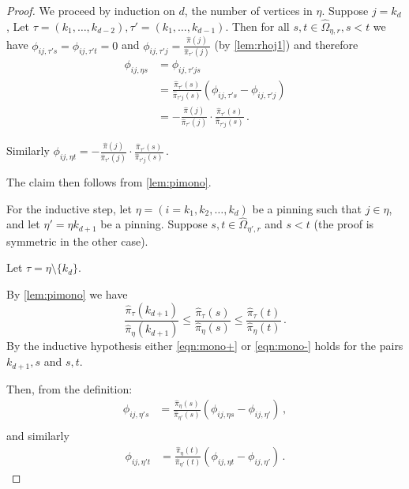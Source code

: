 \documentclass[a4paper, 12p]{article}
\numberwithin{equation}{section}
\newcommand{\Omorproj}{\hat{\Omega}}
\newcommand{\piorproj}{\hat{\pi}}
\begin{document}
\begin{proof}
We proceed by induction on $d$, the number of vertices in $\eta$. Suppose $j = k_d$, Let $\tau = (k_1, \dots, k_{d-2}), \tau' = (k_1, \dots, k_{d-1}).$ Then for all $s, t \in \Omorproj_{\eta, r}, s < t$ we have $\phi_{ij,\tau' s} = \phi_{ij, \tau' t} = 0$ and $\phi_{ij, \tau' j} = \frac{\piorproj(j)}{\piorproj_{\tau'}(j)}$ (by \cref{lem:rhoj1}) and therefore
\begin{align}
  \phi_{ij,\eta s} &= \phi_{ij, \tau' j s} \\
  &= \frac{\piorproj_{\tau'}(s)}{\piorproj_{\tau' j}(s)}(\phi_{ij, \tau' s} - \phi_{ij, \tau' j}) \\
  &= -\frac{\piorproj(j)}{\piorproj_{\tau'}(j)}\cdot \frac{\piorproj_{\tau'}(s)}{\piorproj_{\tau' j}(s)}\,.
\end{align}

Similarly $\phi_{ij,\eta t} = -\frac{\piorproj(j)}{\piorproj_{\tau'}(j)}\cdot \frac{\piorproj_{\tau'}(s)}{\piorproj_{\tau' j}(s)}\,.$

The claim then follows from \cref{lem:pimono}.

For the inductive step, let $\eta = (i = k_1, k_2, \dots, k_d)$ be a pinning such that $j \in \eta$, and let $\eta' = \eta k_{d+1}$ be a pinning. Suppose $s, t \in \Omorproj_{\eta', r}$ and $s < t$ (the proof is symmetric in the other case).

Let $\tau = \eta \setminus \{k_d\}$.

By \cref{lem:pimono} we have 
\begin{equation}
    \frac{\piorproj_{\tau}(k_{d+1})}{\piorproj_{\eta}(k_{d+1})}\leq \frac{\piorproj_{\tau}(s)}{\piorproj_{\eta}(s)} \leq \frac{\piorproj_{\tau}(t)}{\piorproj_{\eta}(t)}\,.
\end{equation}
By the inductive hypothesis either \eqref{eqn:mono+} or \eqref{eqn:mono-} holds for the pairs $k_{d+1}, s$ and $s,t$.


Then, from the definition:
\begin{align*}
    \phi_{ij,\eta's} &= \frac{\piorproj_{\eta}(s)}{\piorproj_{\eta'}(s)}(\phi_{ij,\eta s} - \phi_{ij,\eta'})\,, \nonumber \\
\end{align*}
and similarly 
\begin{align*}
   \phi_{ij,\eta' t}  &= \frac{\piorproj_{\eta}(t)}{\piorproj_{\eta'}(t)}(\phi_{ij,\eta t} - \phi_{ij,\eta'})\,.
\end{align*}


\end{proof}
\end{document}
